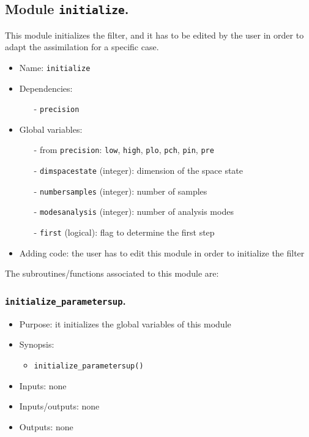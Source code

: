 \documentclass[12pt]{article}
\begin{document}
\subsection{Module {\tt initialize}.}
This module initializes the filter, and it has to be edited by the user in order to adapt the assimilation for a specific case.
\begin{itemize}
\item Name: {\tt initialize}
\item Dependencies: 
\begin{itemize}
\item[-] {\tt precision}
\end{itemize}
\item Global variables: 
\begin{itemize}
\item[-] from {\tt precision}: {\tt low}, {\tt high}, {\tt plo}, {\tt pch}, {\tt pin}, {\tt pre} 
\item[-] {\tt dimspacestate} (integer): dimension of the space state 
\item[-] {\tt numbersamples} (integer): number of samples
\item[-] {\tt modesanalysis} (integer): number of analysis modes
\item[-] {\tt first} (logical): flag to determine the first step
\end{itemize}
\item Adding code: the user has to edit this module in order to initialize the filter
\end{itemize}

The subroutines/functions associated to this module are:

\subsubsection{{\tt initialize\_parametersup}.}
\begin{itemize}
\item Purpose: it initializes the global variables of this module
\item Synopsis: 
\begin{itemize}
\item {\tt initialize\_parametersup()}
\end{itemize}
\item Inputs: none 
\item Inputs/outputs: none
\item Outputs: none
\end{itemize} 
\end{document}

